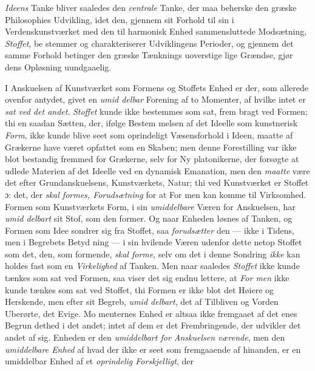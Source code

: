 \emph{Ideens} Tanke bliver saaledes den \emph{centrale} Tanke, der
maa beherske den græske Philosophies Udvikling, idet den,
gjennem sit Forhold til sin i Verdenskunstværket med den til
harmonisk Enhed sammensluttede Modsætning, \emph{Stoffet}, be\-%
stemmer og charakteriserer Udviklingens Perioder, og gjennem
det samme Forhold betinger den græske Tænknings uoverstige\-%
lige Grændse, gjør dens Opløsning uundgaaelig.

I Anskuelsen af Kunstværket som Formens og Stoffets
 Enhed er der, som allerede ovenfor antydet, givet en \emph{umid\-%
delbar} Forening af to Momenter, af hvilke intet er \emph{sat ved
det andet}. \emph{Stoffet} kunde ikke bestemmes som sat, frem\-%
bragt ved Formen; thi en saadan Sætten, der, ifølge Bestem\-%
melsen af det Ideelle som kunstnerisk \emph{Form}, ikke kunde blive
seet som oprindeligt Væsensforhold i Ideen, maatte af Grækerne
have været opfattet som en Skaben; men denne Forestilling
var ikke blot bestandig fremmed for Grækerne, selv for Ny\-%
platonikerne, der forsøgte at udlede Materien af det Ideelle ved
en dynamisk Emanation, men den \emph{maatte} være det efter
Grundanskuelsens, Kunstværkets, Natur; thi ved Kunstværket er
Stoffet ɔ: det, der \emph{skal formes, Forudsætning} for at For\-%
men kan komme til Virksomhed. Formen som Kunstværkets
Form, i sin \emph{umiddelbare} Væren for Anskuelsen, har \emph{umid\-%
delbart} sit Stof, som den former. Og naar Enheden løsnes
af Tanken, og Formen som Idee sondrer sig fra Stoffet, saa
\emph{forudsætter} den --- ikke i Tidens, men i Begrebets Betyd\-%
ning --- i sin hvilende Væren udenfor dette netop Stoffet
som det, den, som formende, \emph{skal forme}, selv om det
i denne Sondring \emph{ikke} kan holdes fast som en \emph{Virkelighed}
af Tanken. Men naar saaledes \emph{Stoffet} ikke kunde tænkes
som sat ved Formen, saa viser det sig endnu lettere, at \emph{For\-%
men} ikke kunde tænkes som sat ved Stoffet, thi Formen er
ikke blot det Høiere og Herskende, men efter sit Begreb, \emph{umid\-%
delbart}, det af Tilbliven og Vorden Uberørte, det Evige. Mo\-%
menternes Enhed er altsaa ikke fremgaaet af det enes Begrun\-%
dethed i det andet; intet af dem er det Frembringende, der
udvikler det andet af sig. Enheden er den \emph{umiddelbart
for Anskuelsen værende}, men den \emph{umiddelbare Enhed} af
hvad der ikke er seet som fremgaaende af hinanden, er en
umiddelbar Enhed af et \emph{oprindelig Forskjelligt}, der
